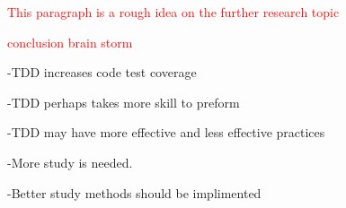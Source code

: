 \documentclass{sig-alternate}
\newcommand{\mycomment}[1]{\textcolor{red}{#1}}
\begin{document}
\mycomment{This paragraph is a rough idea on the further research topic}

\mycomment{conclusion brain storm}

-TDD increases code test coverage

-TDD perhaps takes more skill to preform

-TDD may have more effective and less effective practices

-More study is needed.

-Better study methods should be implimented


  
\end{document}
